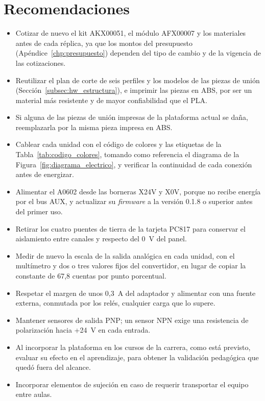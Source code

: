 \documentclass[12pt,a4paper,oneside]{report}
\begin{document}
\section{Recomendaciones}

\begin{itemize}
    \item Cotizar de nuevo el kit AKX00051, el módulo AFX00007 y los materiales antes de cada réplica, ya que los montos del presupuesto (Apéndice~\ref{chp:presupuesto}) dependen del tipo de cambio y de la vigencia de las cotizaciones.
    \item Reutilizar el plan de corte de seis perfiles y los modelos de las piezas de unión (Sección~\ref{subsec:hw_estructura}), e imprimir las piezas en ABS, por ser un material más resistente y de mayor confiabilidad que el PLA.
    \item Si alguna de las piezas de unión impresas de la plataforma actual se daña, reemplazarla por la misma pieza impresa en ABS.
    \item Cablear cada unidad con el código de colores y las etiquetas de la Tabla~\ref{tab:codigo_colores}, tomando como referencia el diagrama de la Figura~\ref{fig:diagrama_electrico}, y verificar la continuidad de cada conexión antes de energizar.
    \item Alimentar el A0602 desde las borneras X24V y X0V, porque no recibe energía por el bus AUX, y actualizar su \emph{firmware} a la versión 0.1.8 o superior antes del primer uso.
   
    \item Retirar los cuatro puentes de tierra de la tarjeta PC817 para conservar el aislamiento entre canales y respecto del 0~V del panel.
    \item Medir de nuevo la escala de la salida analógica en cada unidad, con el multímetro y dos o tres valores fijos del convertidor, en lugar de copiar la constante de 67,8 cuentas por punto porcentual.
    \item Respetar el margen de unos 0,3~A del adaptador y alimentar con una fuente externa, conmutada por los relés, cualquier carga que lo supere.
    \item Mantener sensores de salida PNP; un sensor NPN exige una resistencia de polarización hacia +24~V en cada entrada.
  
  
    \item Al incorporar la plataforma en los cursos de la carrera, como está previsto, evaluar su efecto en el aprendizaje, para obtener la validación pedagógica que quedó fuera del alcance.
    \item Incorporar elementos de sujeción en caso de requerir transportar el equipo entre aulas.
\end{itemize}
\end{document}
